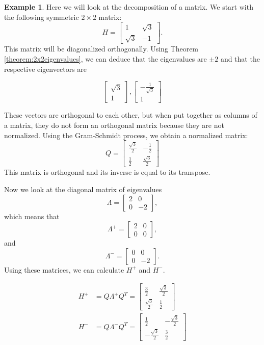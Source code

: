 \documentclass[12pt]{article}
\numberwithin{equation}{section}
\numberwithin{figure}{section}
\numberwithin{table}{section}
\theoremstyle{definition}
\newtheorem{example}{Example}[section]
\theoremstyle{remark}
\numberwithin{equation}{section}
\begin{document}
\begin{example}

Here we will look at the decomposition of a matrix. We start with the following symmetric  $2 \times 2$ matrix:
\[
H = \begin{bmatrix}
1 & \sqrt{3}  \\
\sqrt{3} & -1
\end{bmatrix}.
\]
This matrix will be diagonalized orthogonally. Using Theorem \ref{theorem:2x2eigenvalues}, we can deduce that the eigenvalues are $\pm 2$ and that the respective eigenvectors are 

\[
\begin{bmatrix}
\sqrt{3} \\
1
\end{bmatrix}
%
,
\begin{bmatrix}
- \frac{1}{\sqrt{3}}  \\
1
\end{bmatrix}
\]

These vectors are orthogonal to each other, but when put together as columns of a matrix, they do not form an orthogonal matrix because they are not normalized. Using the Gram-Schmidt process, we obtain a normalized matrix:
\[
Q = \begin{bmatrix}
\frac{\sqrt{3}}{2}  & - \frac{1}{2} \\
\frac{1}{2} & \frac{\sqrt{3}}{2}
\end{bmatrix}
\]
This matrix is orthogonal and its inverse is equal to its transpose.

Now we look at the diagonal matrix of eigenvalues 
\[
\Lambda = \begin{bmatrix}
2 & 0  \\
0 & -2
\end{bmatrix}, 
\]
which means that 
\[
\Lambda^{+} = \begin{bmatrix}
2 & 0  \\
0 & 0
\end{bmatrix},
\]
and 
\[
\Lambda^{-} = \begin{bmatrix}
0 & 0  \\
0 & -2
\end{bmatrix}.
\]
Using these matrices, we can calculate $H^{+}$ and $H^{-}$.

\begin{align*}
	H^{+}
	&= Q \Lambda^{+} Q^{T} = \begin{bmatrix}
										\frac{3}{2} & \frac{\sqrt{3}}{2}  \\
										\frac{\sqrt{3}}{2} & \frac{1}{2}
										\end{bmatrix}
	\\
	H^{-}
	&= Q \Lambda^{-} Q^{T} = \begin{bmatrix}
										\frac{1}{2} & - \frac{\sqrt{3}}{2}  \\
										- \frac{\sqrt{3}}{2} & \frac{3}{2}
										\end{bmatrix}
\end{align*}


\end{example}
\end{document}
